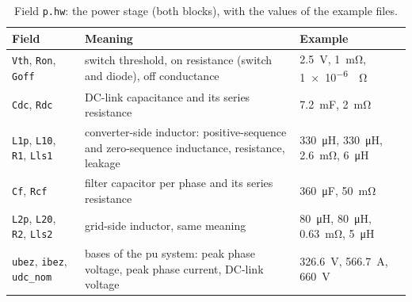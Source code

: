 \documentclass[11pt,a4paper]{scrartcl}
\newcommand{\code}[1]{\texttt{#1}}
\begin{document}
\begin{onehalfspace}
\begin{table}[H]
	\centering
	\captionsetup{width=0.9\textwidth, font=small}
	\caption[Field \code{p.hw}.]{Field \code{p.hw}: the power stage (both blocks), with the values of the example files.}
	\label{tab:hw}
	\footnotesize
	\begin{tabularx}{0.97\textwidth}{@{} >{\raggedright\arraybackslash}p{} X >{\raggedright\arraybackslash}p{} @{}}
		\toprule
		\textbf{Field} & \textbf{Meaning} & \textbf{Example} \\
		\midrule
		\code{Vth}, \code{Ron}, \code{Goff} & switch threshold, on resistance (switch and diode), off conductance & \SI{2.5}{\volt}, \SI{1}{\milli\ohm}, \SI{1e-6}{\per\ohm} \\
		\code{Cdc}, \code{Rdc} & DC-link capacitance and its series resistance & \SI{7.2}{\milli\farad}, \SI{2}{\milli\ohm} \\
		\code{L1p}, \code{L10}, \code{R1}, \code{Lls1} & converter-side inductor: positive-sequence and zero-sequence inductance, resistance, leakage & \SI{330}{\micro\henry}, \SI{330}{\micro\henry}, \SI{2.6}{\milli\ohm}, \SI{6}{\micro\henry} \\
		\code{Cf}, \code{Rcf} & filter capacitor per phase and its series resistance & \SI{360}{\micro\farad}, \SI{50}{\milli\ohm} \\
		\code{L2p}, \code{L20}, \code{R2}, \code{Lls2} & grid-side inductor, same meaning & \SI{80}{\micro\henry}, \SI{80}{\micro\henry}, \SI{0.63}{\milli\ohm}, \SI{5}{\micro\henry} \\
		\code{ubez}, \code{ibez}, \code{udc\_nom} & bases of the pu system: peak phase voltage, peak phase current, DC-link voltage & \SI{326.6}{\volt}, \SI{566.7}{\ampere}, \SI{660}{\volt} \\
		\bottomrule
	\end{tabularx}
\end{table}


\end{onehalfspace}
\end{document}
